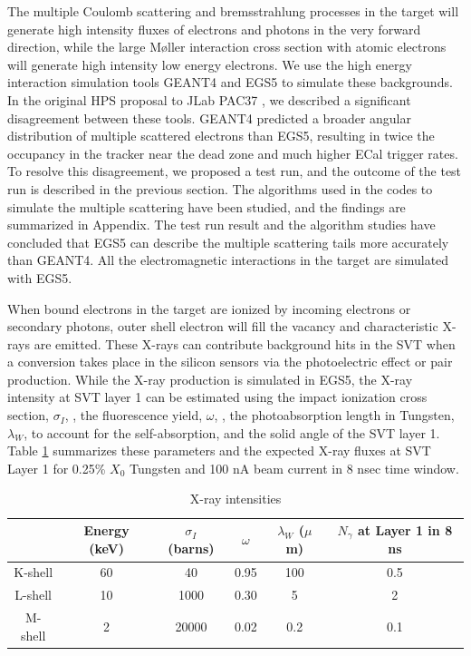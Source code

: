 The multiple Coulomb scattering and bremsstrahlung processes in the target will generate high 
intensity fluxes of electrons and photons in the very forward direction, while the large
M{\o}ller interaction cross section with atomic electrons will generate high intensity low energy
electrons. We use the high energy interaction simulation tools GEANT4 and EGS5 to simulate 
these backgrounds. In the original HPS proposal to JLab PAC37 \cite{HPS_PROP}, we described a significant 
disagreement between these tools. GEANT4 predicted a broader angular
distribution of multiple scattered electrons than EGS5, resulting in twice the occupancy in the
tracker near the dead zone and much higher ECal trigger rates. 
To resolve this disagreement, we proposed a test run, and the outcome of the test run is described 
in the previous section. The algorithms used 
in the codes to simulate the multiple scattering have been studied, and the findings are summarized in
Appendix. The test run result and the algorithm studies have concluded that EGS5 can describe the multiple scattering 
tails more accurately than GEANT4. All the electromagnetic interactions in the target are simulated with EGS5.   

When bound electrons in the target are ionized by incoming electrons or secondary photons, outer 
shell electron will fill the vacancy and characteristic X-rays are emitted. 
These X-rays can contribute background hits in
the SVT when a conversion takes place in the silicon sensors via the photoelectric effect 
or pair production. While the X-ray production is simulated in EGS5, the X-ray intensity at SVT layer 1
can be estimated using  the impact ionization 
cross section, $\sigma_I$, \cite{hoffmann}, the fluorescence yield, $\omega$, \cite{hubbell},
the photoabsorption length in Tungsten, $\lambda_W$, to account for the self-absorption, and the solid 
angle of the SVT layer 1.
Table \ref{tab:xray} summarizes these parameters and the expected X-ray
fluxes at SVT Layer 1 for 0.25\% $X_0$ Tungsten and 100 nA beam current in 8 nsec time window. 

\begin{table}[h]
\begin{center}
\begin{tabular}{|c|c|c|c|c|c|} \hline
  & Energy (keV) & $\sigma_I$ (barns) & \hspace{0.5 cm} $\omega$ \hspace{0.5 cm} & $\lambda_W$ ($\mu$m) & $N_\gamma$ at Layer 1 in 8 ns   \\ \hline
K-shell & 60 & 40 & 0.95 & 100 & 0.5 \\ \hline
L-shell  & 10 & 1000 & 0.30 & 5 & 2 \\ \hline
M-shell  & 2 & 20000 & 0.02 & 0.2 & 0.1 \\ \hline
\end{tabular}
\end{center}
\caption{\small{X-ray intensities}}
\label{tab:xray}
\end{table}

